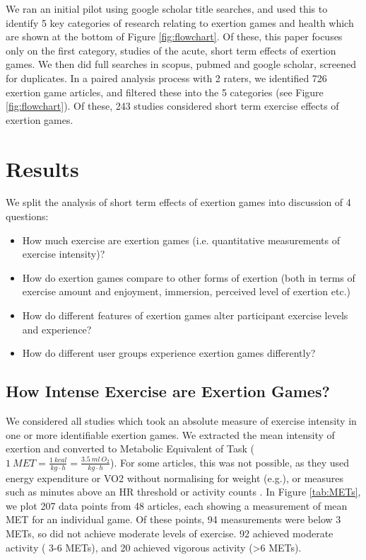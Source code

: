 We ran an initial pilot using google scholar title searches, and used this to identify 5 key categories of research relating to exertion games and health which are shown at the bottom of Figure \ref{fig:flowchart}. Of these, this paper focuses only on the first category, studies of the acute, short term effects of exertion games. We then did full searches in scopus, pubmed and google scholar, screened for duplicates. In a paired analysis process with 2 raters, we identified 726 exertion game articles, and filtered these into the 5 categories (see Figure \ref{fig:flowchart}). Of these, 243 studies considered short term exercise effects of exertion games.  


\section{Results}

We split the analysis of short term effects of exertion games into discussion of 4 questions:
\begin{itemize}
    \item How much exercise are exertion games (i.e. quantitative measurements of exercise intensity)?
    \item How do exertion games compare to other forms of exertion (both in terms of exercise amount and enjoyment, immersion, perceived level of exertion etc.)
    \item How do different features of exertion games alter participant exercise levels and experience?
    \item How do different user groups experience exertion games differently?
\end{itemize}



\subsection{How Intense Exercise are Exertion Games?}

We considered all studies which took an absolute measure of exercise intensity in one or more identifiable exertion games. We extracted the mean intensity of exertion and converted to Metabolic Equivalent of Task ( $1~MET= \frac{1~kcal}{ kg \cdot h} = \frac{3.5~ml~O_2}{ kg \cdot h}  $). For some  articles, this was not possible, as they used energy expenditure or VO2 without normalising for weight (e.g.\cite{Gribbon2015ActiveTrial}), or measures such as minutes above an HR threshold \cite{MacIntosh2017BalancingIii} or activity counts \cite{McDougall2008ChildrenStudy}. In Figure \ref{tab:METs}, we plot 207 data points from 48 articles, each showing a measurement of mean MET for an individual game. Of these points, 94 measurements were below 3 METs, so did not achieve moderate levels of exercise. 92 achieved moderate activity ( 3-6 METs), and 20 achieved vigorous activity (\textgreater 6 METs).
  
